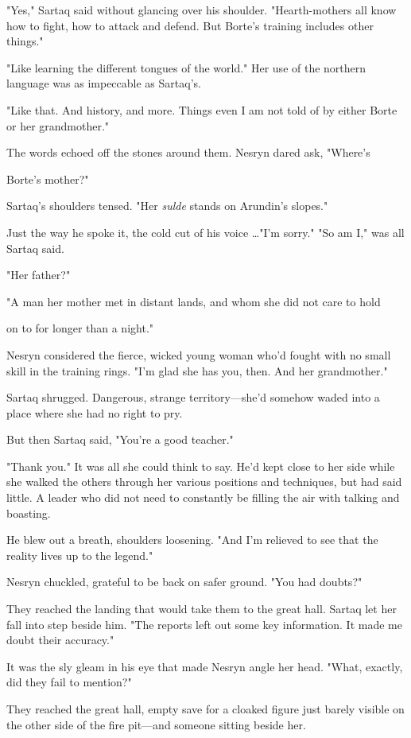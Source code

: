 "Yes," Sartaq said without glancing over his shoulder. "Hearth-mothers all know how to fight, how to attack and defend. But Borte's training includes other things."

"Like learning the different tongues of the world." Her use of the northern language was as impeccable as Sartaq's.

"Like that. And history, and  more. Things even I am not told of by either Borte or her grandmother."

The words echoed off the stones around them. Nesryn dared ask, "Where's

Borte's mother?"

Sartaq's shoulders tensed. "Her \emph{sulde} stands on Arundin's slopes."

Just the way he spoke it, the cold cut of his voice \ldots"I'm sorry." "So am I," was all Sartaq said.

"Her father?"

"A man her mother met in distant lands, and whom she did not care to hold

on to for longer than a night."

Nesryn considered the fierce, wicked young woman who'd fought with no small skill in the training rings. "I'm glad she has you, then. And her grandmother."

Sartaq shrugged. Dangerous, strange territory---she'd somehow waded into a place where she had no right to pry.

But then Sartaq said, "You're a good teacher."

"Thank you." It was all she could think to say. He'd kept close to her side while she walked the others through her various positions and techniques, but had said little. A leader who did not need to constantly be filling the air with talking and boasting.

He blew out a breath, shoulders loosening. "And I'm relieved to see that the reality lives up to the legend."

Nesryn chuckled, grateful to be back on safer ground. "You had doubts?"

They reached the landing that would take them to the great hall. Sartaq let her fall into step beside him. "The reports left out some key information. It made me doubt their accuracy."

It was the sly gleam in his eye that made Nesryn angle her head. "What, exactly, did they fail to mention?"

They reached the great hall, empty save for a cloaked figure just barely visible on the other side of the fire pit---and someone sitting beside her.

